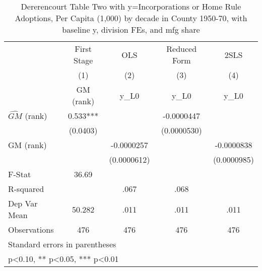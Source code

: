 \begin{table}[htbp]\centering
\def\sym#1{\ifmmode^{#1}\else\(^{#1}\)\fi}
\caption{Dererencourt Table Two with y=Incorporations or Home Rule Adoptions, Per Capita (1,000) by decade in County 1950-70, with baseline y, division FEs, and mfg share}
\begin{tabular}{l*{4}{c}}
\toprule
                    & First Stage   &         OLS   &Reduced Form   &        2SLS   \\
                    &\multicolumn{1}{c}{(1)}&\multicolumn{1}{c}{(2)}&\multicolumn{1}{c}{(3)}&\multicolumn{1}{c}{(4)}\\
                    &\multicolumn{1}{c}{GM  (rank)}&\multicolumn{1}{c}{y\_L0}&\multicolumn{1}{c}{y\_L0}&\multicolumn{1}{c}{y\_L0}\\
\midrule
$\hat{GM}$ (rank)   &       0.533***&               &  -0.0000447   &               \\
                    &    (0.0403)   &               & (0.0000530)   &               \\
\addlinespace
GM  (rank)          &               &  -0.0000257   &               &  -0.0000838   \\
                    &               & (0.0000612)   &               & (0.0000985)   \\
\midrule
F-Stat              &       36.69   &               &               &               \\
R-squared           &               &        .067   &        .068   &               \\
Dep Var Mean        &      50.282   &        .011   &        .011   &        .011   \\
Observations        &         476   &         476   &         476   &         476   \\
\bottomrule
\multicolumn{5}{l}{\footnotesize Standard errors in parentheses}\\
\multicolumn{5}{l}{\footnotesize * p<0.10, ** p<0.05, *** p<0.01}\\
\end{tabular}
\end{table}
